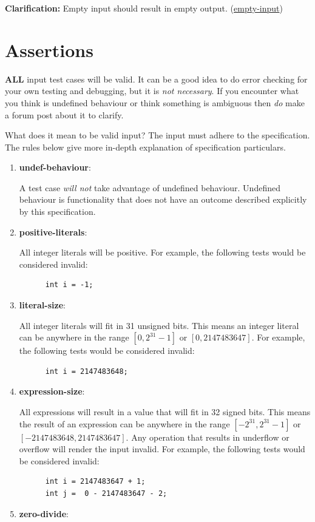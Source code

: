 \documentclass{article}
\newcommand{\assertiondest}[1]{\hypertarget{#1}{\textbf{#1}:}}
\newcommand{\clarification}[2]{\textbf{Clarification: }#1 (\hyperlink{#2}{#2})}
\begin{document}
\clarification{Empty input should result in empty output.}{empty-input}

\section{Assertions}
\textbf{ALL} input test cases will be valid. It can be a good idea to do error checking for your
own testing and debugging, but it is \textit{not necessary}. If you encounter what you think is
undefined behaviour or think something is ambiguous then \textit{do} make a forum post about it to
clarify.

What does it mean to be valid input? The input must adhere to the specification. The rules below
give more in-depth explanation of specification particulars.
\begin{enumerate}
  \item
    \assertiondest{undef-behaviour}
    A test case \textit{will not} take advantage of undefined behaviour. Undefined behaviour is
    functionality that does not have an outcome described explicitly by this specification.
  \item
    \assertiondest{positive-literals}
    All integer literals will be positive. For example, the following tests would be considered
    invalid:
    \begin{lstlisting}
      int i = -1;
    \end{lstlisting}
  \item
    \assertiondest{literal-size}
    All integer literals will fit in 31 unsigned bits. This means an integer literal can be
    anywhere in the range $[0, 2^{31} - 1]$ or $[0, 2147483647]$. For example, the following tests
    would be considered invalid:
    \begin{lstlisting}
      int i = 2147483648;
    \end{lstlisting}
  \item
    \assertiondest{expression-size}
    All expressions will result in a value that will fit in 32 signed bits. This means the result
    of an expression can be anywhere in the range $[-2^{31}, 2^{31} - 1]$ or $[-2147483648,
    2147483647]$. Any operation that results in underflow or overflow will render the input
    invalid. For example, the following tests would be considered invalid:
    \begin{lstlisting}
      int i = 2147483647 + 1;
      int j =  0 - 2147483647 - 2;
    \end{lstlisting}
  \item
    \assertiondest{zero-divide}

\end{enumerate}
\end{document}
